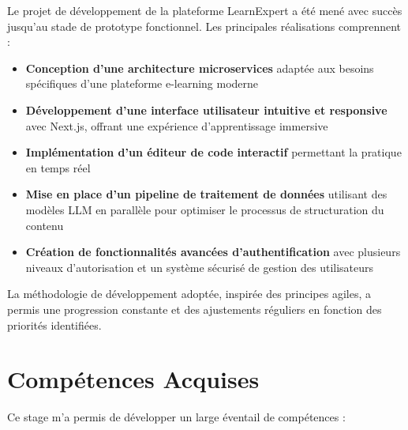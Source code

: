 \documentclass[12pt, a4paper]{report}
\begin{document}
Le projet de développement de la plateforme LearnExpert a été mené avec succès jusqu'au stade de prototype fonctionnel. Les principales réalisations comprennent :

\begin{itemize}
  \item \textbf{Conception d'une architecture microservices} adaptée aux besoins spécifiques d'une plateforme e-learning moderne
  \item \textbf{Développement d'une interface utilisateur intuitive et responsive} avec Next.js, offrant une expérience d'apprentissage immersive
  \item \textbf{Implémentation d'un éditeur de code interactif} permettant la pratique en temps réel
  \item \textbf{Mise en place d'un pipeline de traitement de données} utilisant des modèles LLM en parallèle pour optimiser le processus de structuration du contenu
  \item \textbf{Création de fonctionnalités avancées d'authentification} avec plusieurs niveaux d'autorisation et un système sécurisé de gestion des utilisateurs
\end{itemize}

La méthodologie de développement adoptée, inspirée des principes agiles, a permis une progression constante et des ajustements réguliers en fonction des priorités identifiées.

\section{Compétences Acquises}

Ce stage m'a permis de développer un large éventail de compétences :
\end{document}
